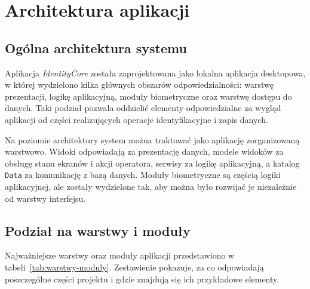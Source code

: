 \chapter{Architektura aplikacji}
\label{chap:architektura}

\section{Ogólna architektura systemu}

Aplikacja \textit{IdentityCore} została zaprojektowana jako lokalna aplikacja desktopowa, w której wydzielono kilka głównych obszarów odpowiedzialności: warstwę prezentacji, logikę aplikacyjną, moduły biometryczne oraz warstwę dostępu do danych. Taki podział pozwala oddzielić elementy odpowiedzialne za wygląd aplikacji od części realizujących operacje identyfikacyjne i zapis danych.

Na poziomie architektury system można traktować jako aplikację zorganizowaną warstwowo. Widoki odpowiadają za prezentację danych, modele widoków za obsługę stanu ekranów i akcji operatora, serwisy za logikę aplikacyjną, a katalog \texttt{Data} za komunikację z bazą danych. Moduły biometryczne są częścią logiki aplikacyjnej, ale zostały wydzielone tak, aby można było rozwijać je niezależnie od warstwy interfejsu.

\section{Podział na warstwy i moduły}

Najważniejsze warstwy oraz moduły aplikacji przedstawiono w tabeli~\ref{tab:warstwy-moduly}. Zestawienie pokazuje, za co odpowiadają poszczególne części projektu i gdzie znajdują się ich przykładowe elementy.

